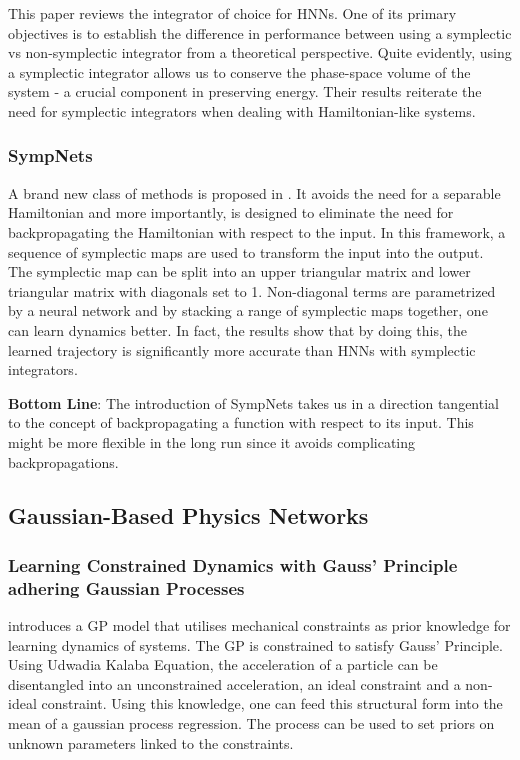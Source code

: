 \documentclass{article}
\begin{document}
This paper \cite{zhu_deep_2020} reviews the integrator of choice for HNNs. One of its primary objectives is to establish the difference in performance between using a symplectic vs non-symplectic integrator from a theoretical perspective. Quite evidently, using a symplectic integrator allows us to conserve the phase-space volume of the system - a crucial component in preserving energy. Their results reiterate the need for symplectic integrators when dealing with Hamiltonian-like systems.

\subsubsection{SympNets}

A brand new class of methods is proposed in \cite{jin_sympnets_2020}. It avoids the need for a separable Hamiltonian and more importantly, is designed to eliminate the need for backpropagating the Hamiltonian with respect to the input. In this framework, a sequence of symplectic maps are used to transform the input into the output. The symplectic map can be split into an upper triangular matrix and lower triangular matrix with diagonals set to 1. Non-diagonal terms are parametrized by a neural network and by stacking a range of symplectic maps together, one can learn dynamics better. In fact, the results show that by doing this, the learned trajectory is significantly more accurate than HNNs with symplectic integrators.

\textbf{Bottom Line}: The introduction of SympNets takes us in a direction tangential to the concept of backpropagating a function with respect to its input. This might be more flexible in the long run since it avoids complicating backpropagations. 

\subsection{Gaussian-Based Physics Networks}
\subsubsection{Learning Constrained Dynamics with Gauss' Principle adhering Gaussian Processes}

\cite{geist_learning_2020} introduces a GP model that utilises mechanical constraints as prior knowledge for learning dynamics of systems. The GP is constrained to satisfy Gauss' Principle. Using Udwadia Kalaba Equation, the acceleration of a particle can be disentangled into an unconstrained acceleration, an ideal constraint and a non-ideal constraint. Using this knowledge, one can feed this structural form into the mean of a gaussian process regression. The process can be used to set priors on unknown parameters linked to the constraints.
\end{document}
